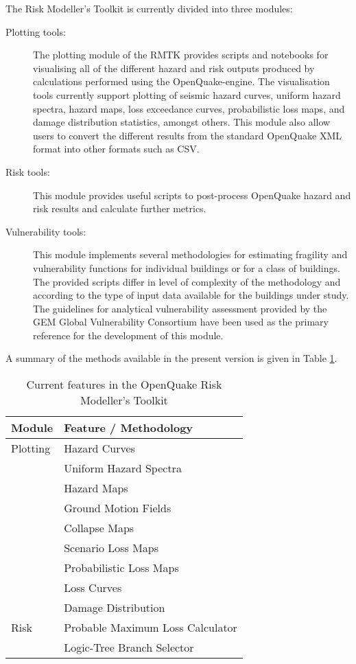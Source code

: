 The Risk Modeller's Toolkit is currently divided into three modules:
\begin{description}
\item[Plotting tools:] The plotting module of the RMTK provides scripts and notebooks for visualising all of the different hazard and risk outputs produced by calculations performed using the OpenQuake-engine. The visualisation tools currently support plotting of seismic hazard curves, uniform hazard spectra, hazard maps, loss exceedance curves, probabilistic loss maps, and damage distribution statistics, amongst others. This module also allow users to convert the different results from the standard OpenQuake XML format into other formats such as CSV.
\item[Risk tools:] This module provides useful scripts to post-process OpenQuake hazard and risk results and calculate further metrics.
\item[Vulnerability tools:] This module implements several methodologies for estimating fragility and vulnerability functions for individual buildings or for a class of buildings. The provided scripts differ in level of complexity of the methodology and according to the type of input data available for the buildings under study. The guidelines for analytical vulnerability assessment provided by the GEM Global Vulnerability Consortium have been used as the primary reference for the development of this module.
\end{description}

A summary of the methods available in the present version is given in Table \ref{tab:current_features}.

\begin{table}[!htbp]
\centering
\begin{tabular}{|l|l|} \hline
\textbf{Module} & \textbf{Feature / Methodology} \\ \hline
Plotting & Hazard Curves \\
         & Uniform Hazard Spectra \\
         & Hazard Maps \\
         & Ground Motion Fields \\
         & Collapse Maps \\
         & Scenario Loss Maps \\
         & Probabilistic Loss Maps \\
         & Loss Curves \\
         & Damage Distribution \\ \hline
Risk & Probable Maximum Loss Calculator \\
	 & Logic-Tree Branch Selector \\ \hline
\end{tabular}
\caption{Current features in the OpenQuake Risk Modeller's Toolkit}
\label{tab:current_features}

\end{table}
